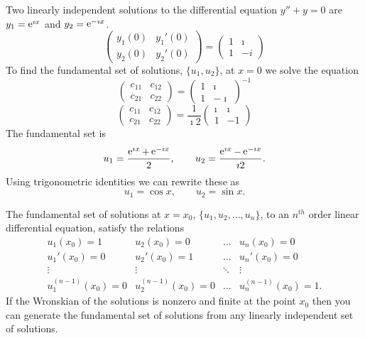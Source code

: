\begin{Example}
  Two linearly independent solutions to the differential equation $y'' + y = 0$
  are $y_1 = \mathop{\mathrm{e}}\nolimits^{\imath x}$ and $y_2 = \mathop{\mathrm{e}}\nolimits^{-\imath x}$.
  \[
  \begin{pmatrix}
    y_1(0)                &y_1'(0) \\
    y_2(0)               &y_2'(0) 
  \end{pmatrix}
  =
  \begin{pmatrix}
    1 & \imath \\
    1 & -i
  \end{pmatrix}
  \]
  To find the fundamental set of solutions, $\{u_1, u_2\}$, at $x=0$ we solve the
  equation
  \[
  \begin{pmatrix}
    c_{11}  &c_{12} \\
    c_{21}  &c_{22} 
  \end{pmatrix}
  =
  \begin{pmatrix}
    1 & \imath \\
    1 & -\imath
  \end{pmatrix}^{-1}
  \]
  \[
  \begin{pmatrix}
    c_{11}  &c_{12} \\
    c_{21}  &c_{22} 
  \end{pmatrix}
  =
  \frac{1}{\imath 2}
  \begin{pmatrix}
    \imath & \imath \\
    1 & -1
  \end{pmatrix}
  \]
  The fundamental set is
  \[ u_1 = \frac{\mathop{\mathrm{e}}\nolimits^{\imath x} + \mathop{\mathrm{e}}\nolimits^{-\imath x}}{2}, \qquad u_2 = \frac{\mathop{\mathrm{e}}\nolimits^{\imath x}
    -\mathop{\mathrm{e}}\nolimits^{-\imath x}}{\imath 2}.\]
  Using trigonometric identities we can rewrite these as
  \[ u_1 = \cos x, \qquad u_2 = \sin x. \]
\end{Example}



\begin{Result}
  The fundamental set of solutions at $x=x_0$, $\{u_1, u_2, \ldots, u_n\}$,
  to an $n^{t h}$ order linear differential equation, satisfy the relations
  \[
  \begin{matrix}
    u_1(x_0) = 1    &u_2(x_0) = 0           &\ldots         &u_n(x_0)=0 \\
    u_1'(x_0) = 0   &u_2'(x_0) = 1          &\ldots         &u_n'(x_0)=0 \\
    \vdots          &\vdots                 &\ddots         &\vdots \\
    u_1^{(n-1)}(x_0) = 0    &u_2^{(n-1)}(x_0) = 0   &\ldots &u_n^{(n-1)}(x_0)=1. 
  \end{matrix}
  \]
  If the Wronskian of the solutions is nonzero and finite at the point
  $x_0$ then you can generate the fundamental set of solutions
  from any linearly independent set of solutions.
\end{Result}







